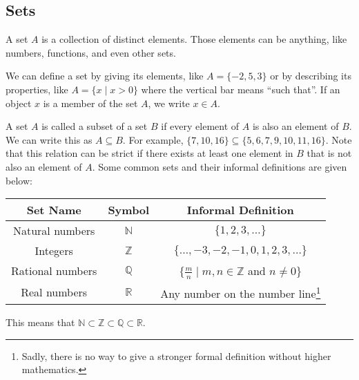 \subsection{Sets}
\begin{definition}
	A set $A$ is a collection of distinct elements. Those elements can be anything, like numbers, functions, and even other sets.
\end{definition}
We can define a set by giving its elements, like $A = \{-2, 5, 3\}$ or by describing its properties, like $A = \{x \mid x > 0\}$ where the vertical bar means ``such that''.
If an object $x$ is a member of the set $A$, we write $x\in A$.\bigskip


\noindent
A set $A$ is called a subset of a set $B$ if every element of $A$ is also an element of $B$. 
We can write this as $A \subseteq B$. 
For example, $\{7, 10, 16\} \subseteq \{5, 6, 7, 9, 10, 11, 16\}$. 
Note that this relation can be strict if there exists at least one element in $B$ that is not also an element of $A$. 
Some common sets and their informal definitions are given below:

\begin{table}[H]
	\centering
	\begin{tabular}{c|c|c}
		Set Name & Symbol & Informal Definition                                                                                                                         \\ \hline
		Natural numbers & $\mathbb{N}$ & $\{1, 2, 3, \dots\}$           						                                                                        \\
		Integers & $\mathbb{Z}$ & $\{\dots, -3, -2, -1, 0, 1, 2, 3, \dots\}$                                                                                            \\
		Rational numbers & $\mathbb{Q}$ & $\{\frac{m}{n} \mid m,n \in\mathbb{Z}$ and $n \neq 0\}$                                                                       \\
		Real numbers & $\mathbb{R}$ & Any number on the number line\footnote{Sadly, there is no way to give a stronger formal definition without higher mathematics.}   \\
	\end{tabular}
\end{table}

This means that $\mathbb{N} \subset \mathbb{Z} \subset \mathbb{Q} \subset \mathbb{R}$.\bigskip


